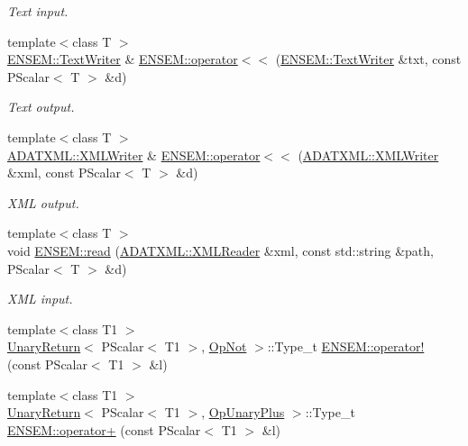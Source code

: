 \begin{DoxyCompactItemize}
\begin{DoxyCompactList}\small\item\em Text input. \end{DoxyCompactList}\item 
{\footnotesize template$<$class T $>$ }\\\mbox{\hyperlink{classENSEM_1_1TextWriter}{E\+N\+S\+E\+M\+::\+Text\+Writer}} \& \mbox{\hyperlink{group__primscalar_gaa851ed6964c4ac3ce548dfb95692f221}{E\+N\+S\+E\+M\+::operator$<$$<$}} (\mbox{\hyperlink{classENSEM_1_1TextWriter}{E\+N\+S\+E\+M\+::\+Text\+Writer}} \&txt, const P\+Scalar$<$ T $>$ \&d)
\begin{DoxyCompactList}\small\item\em Text output. \end{DoxyCompactList}\item 
{\footnotesize template$<$class T $>$ }\\\mbox{\hyperlink{classADATXML_1_1XMLWriter}{A\+D\+A\+T\+X\+M\+L\+::\+X\+M\+L\+Writer}} \& \mbox{\hyperlink{group__primscalar_ga7c71fa022421c2fa564d74338851def4}{E\+N\+S\+E\+M\+::operator$<$$<$}} (\mbox{\hyperlink{classADATXML_1_1XMLWriter}{A\+D\+A\+T\+X\+M\+L\+::\+X\+M\+L\+Writer}} \&xml, const P\+Scalar$<$ T $>$ \&d)
\begin{DoxyCompactList}\small\item\em X\+ML output. \end{DoxyCompactList}\item 
{\footnotesize template$<$class T $>$ }\\void \mbox{\hyperlink{group__primscalar_ga882ac6046905c4b049ed86cd7668b32a}{E\+N\+S\+E\+M\+::read}} (\mbox{\hyperlink{classADATXML_1_1XMLReader}{A\+D\+A\+T\+X\+M\+L\+::\+X\+M\+L\+Reader}} \&xml, const std\+::string \&path, P\+Scalar$<$ T $>$ \&d)
\begin{DoxyCompactList}\small\item\em X\+ML input. \end{DoxyCompactList}\item 
{\footnotesize template$<$class T1 $>$ }\\\mbox{\hyperlink{structUnaryReturn}{Unary\+Return}}$<$ P\+Scalar$<$ T1 $>$, \mbox{\hyperlink{structOpNot}{Op\+Not}} $>$\+::Type\+\_\+t \mbox{\hyperlink{group__primscalar_gafea5191a2ebdc35856d62d9284d246be}{E\+N\+S\+E\+M\+::operator!}} (const P\+Scalar$<$ T1 $>$ \&l)
\item 
{\footnotesize template$<$class T1 $>$ }\\\mbox{\hyperlink{structUnaryReturn}{Unary\+Return}}$<$ P\+Scalar$<$ T1 $>$, \mbox{\hyperlink{structOpUnaryPlus}{Op\+Unary\+Plus}} $>$\+::Type\+\_\+t \mbox{\hyperlink{group__primscalar_ga507ae93c4b44a876ae4bf65b02462270}{E\+N\+S\+E\+M\+::operator+}} (const P\+Scalar$<$ T1 $>$ \&l)

\end{DoxyCompactItemize}
